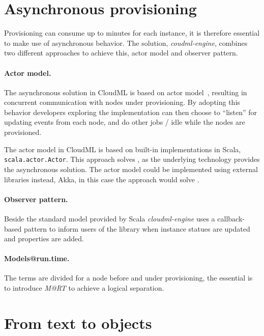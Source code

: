 \section{Asynchronous provisioning}

Provisioning can consume up to minutes for each instance,
it is therefore essential to make use of asynchronous behavior.
The solution, \emph{coudml-engine}, combines two different approaches to achieve this,
actor model and observer pattern.

\paragraph{Actor model.}

The asynchronous solution in CloudML is based on actor model~\cite{actors:haller07},
resulting in concurrent communication with nodes under provisioning.
By adopting this behavior developers exploring the implementation can then choose
to ``listen'' for updating events from each node,
and do other jobs / idle while the nodes are provisioned.

The actor model in CloudML is based on built-in implementations in Scala, 
\texttt{scala.actor.Actor}.
This approach solves ,
as the underlying technology provides the asynchronous solution.
The actor model could be implemented using external libraries instead,
\eg Akka,
in this case the approach would solve .

\paragraph{Observer pattern.}

Beside the standard model provided by Scala \emph{cloudml-engine} uses
a callback-based pattern to inform users of the library when instance statues
are updated and properties are added.

\paragraph{Models@run.time.}

The terms are divided for a node before and under provisioning, the essential is to introduce 
\emph{M@RT} to achieve a logical separation.

\section{From text to objects}


